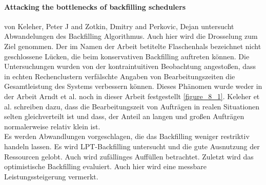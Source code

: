 \paragraph{Attacking the bottlenecks of backfilling schedulers}
von Keleher, Peter J and Zotkin, Dmitry and Perkovic, Dejan \cite{keleher2000attacking} untersucht Abwandelungen des Backfilling Algorithmus. Auch hier wird die Drosselung zum Ziel genommen. Der im Namen der Arbeit betitelte Flaschenhals bezeichnet nicht geschlossene Lücken, die beim konservativen Backfilling auftreten können. Die Untersuchungen wurden von der kontraintuitiven Beobachtung angestoßen, dass in echten Rechenclustern verfälschte Angaben von Bearbeitungszeiten die Gesamtleistung des Systems verbessern können. Dieses Phänomen wurde weder in der Arbeit Arndt et al. \cite{Arn99} noch in dieser Arbeit festgestellt \ref{figure_8_1}. Keleher et al. schreiben dazu, dass die Bearbeitungszeit von Aufträgen in realen Situationen selten gleichverteilt ist und dass, der Anteil an langen und großen Aufträgen normalerweise relativ klein ist.\\
Es werden Abwandlungen vorgeschlagen, die das Backfilling weniger restriktiv handeln lassen. Es wird LPT-Backfilling untersucht und die gute Ausnutzung der Ressourcen gelobt. Auch wird zufällinges Auffüllen betrachtet. Zuletzt wird das optimistische Backfilling evaluiert. Auch hier wird eine messbare Leistungssteigerung vermerkt.
